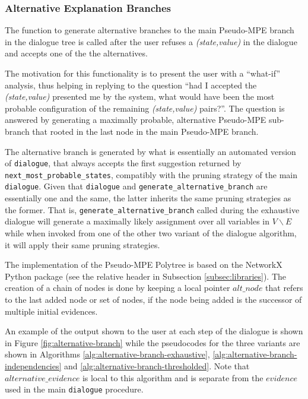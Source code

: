 \subsubsection{Alternative Explanation Branches}
The function to generate alternative branches to the main Pseudo-MPE branch in the dialogue tree is called after the user refuses a \textit{(state,value)} in the dialogue and accepts one of the the alternatives.

The motivation for this functionality is to present the user with a \enquote{what-if} analysis, thus helping in replying to the question \enquote{had I accepted the \textit{(state,value)} presented me by the system, what would have been the most probable configuration of the remaining \textit{(state,value)} pairs?}.
The question is answered by generating a maximally probable, alternative Pseudo-MPE sub-branch that rooted in the last node in the main Pseudo-MPE branch.

The alternative branch is generated by what is essentially an automated version of \texttt{dialogue}, that always accepts the first suggestion returned by \texttt{next\_most\_probable\_states}, compatibly with the pruning strategy of the main \texttt{dialogue}.
Given that \texttt{dialogue} and \texttt{generate\_alternative\_branch} are essentially one and the same, the latter inherits the same pruning strategies as the former.
That is, \texttt{generate\_alternative\_branch} called during the exhaustive dialogue will generate a maximally likely assignment over all variables in $V \smallsetminus E$ while when invoked from one of the other two variant of the dialogue algorithm, it will apply their same pruning strategies.

The implementation of the Pseudo-MPE Polytree is based on the NetworkX Python package (see the relative header in Subsection \ref{subsec:libraries}).
The creation of a chain of nodes is done by keeping a local pointer $alt\_node$ that refers to the last added node or set of nodes, if the node being added is the successor of multiple initial evidences. 

An example of the output shown to the user at each step of the dialogue is shown in Figure \ref{fig:alternative-branch} while the pseudocodes for the three variants are shown in Algorithms \ref{alg:alternative-branch-exhaustive}, \ref{alg:alternative-branch-independencies} and \ref{alg:alternative-branch-thresholded}.
Note that $alternative\_evidence$ is local to this algorithm and is separate from the $evidence$ used in the main \texttt{dialogue} procedure.

